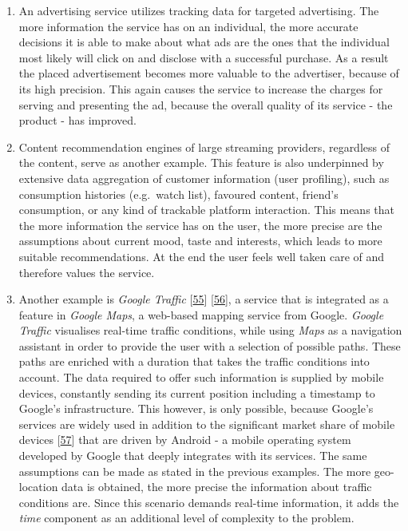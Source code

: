 \documentclass[12pt,english,a4paper,titlepage,cleardoublepage=empty,dottedtoc]{report}
\begin{document}
\begin{enumerate}
\def\labelenumi{\Alph{enumi})}
\item
  An advertising service utilizes tracking data for targeted
  advertising. The more information the service has on an individual,
  the more accurate decisions it is able to make about what ads are the
  ones that the individual most likely will click on and disclose with a
  successful purchase. As a result the placed advertisement becomes more
  valuable to the advertiser, because of its high precision. This again
  causes the service to increase the charges for serving and presenting
  the ad, because the overall quality of its service - the product - has
  improved.
\item
  Content recommendation engines of large streaming providers,
  regardless of the content, serve as another example. This feature is
  also underpinned by extensive data aggregation of customer information
  (user profiling), such as consumption histories (e.g.~watch list),
  favoured content, friend's consumption, or any kind of trackable
  platform interaction. This means that the more information the service
  has on the user, the more precise are the assumptions about current
  mood, taste and interests, which leads to more suitable
  recommendations. At the end the user feels well taken care of and
  therefore values the service.
\item
  Another example is \emph{Google Traffic}
  {[}\protect\hyperlink{ref-web_2007_introducing-google-traffic}{55}{]}
  {[}\protect\hyperlink{ref-web_2016_wikipedia_google-traffic}{56}{]}, a
  service that is integrated as a feature in \emph{Google Maps}, a
  web-based mapping service from Google. \emph{Google Traffic}
  visualises real-time traffic conditions, while using \emph{Maps} as a
  navigation assistant in order to provide the user with a selection of
  possible paths. These paths are enriched with a duration that takes
  the traffic conditions into account. The data required to offer such
  information is supplied by mobile devices, constantly sending its
  current position including a timestamp to Google's infrastructure.
  This however, is only possible, because Google's services are widely
  used in addition to the significant market share of mobile devices
  {[}\protect\hyperlink{ref-graphic_2016_global-mobile-os-market-share}{57}{]}
  that are driven by Android - a mobile operating system developed by
  Google that deeply integrates with its services. The same assumptions
  can be made as stated in the previous examples. The more geo-location
  data is obtained, the more precise the information about traffic
  conditions are. Since this scenario demands real-time information, it
  adds the \emph{time} component as an additional level of complexity to
  the problem.
\end{enumerate}
\end{document}
